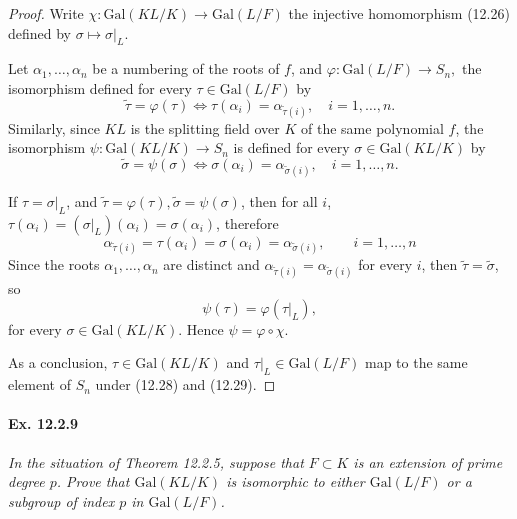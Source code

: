 \documentclass[11pt,a4paper]{article}
\newcommand{\Gal}{\mathrm{Gal}}
\begin{document}
\begin{proof}
Write $\chi : \Gal(KL/K) \to \Gal(L/F)$ the injective homomorphism (12.26) defined by $\sigma  \mapsto \sigma\vert_L$.


Let $\alpha_1,\ldots,\alpha_n$ be a numbering of the roots of $f$, and 
$\varphi : \Gal(L/F) \to S_n,$ the isomorphism defined for every  $\tau \in \Gal(L/F)$ by 
$$\tilde{\tau} = \varphi(\tau) \iff \tau(\alpha_i) = \alpha_{\tilde{\tau}(i)}, \quad i=1,\ldots,n.$$
Similarly, since $KL$ is the splitting field over $K$ of the same polynomial $f$, the isomorphism $\psi : \Gal(KL/K) \to S_n$ is defined for every $\sigma \in \Gal(KL/K)$ by
$$\tilde{\sigma} = \psi(\sigma) \iff \sigma(\alpha_i) = \alpha_{\tilde{\sigma}(i)}, \quad i=1,\ldots,n.$$

If $\tau = \sigma|_L$, and $\tilde{\tau} = \varphi(\tau), \tilde{\sigma}= \psi(\sigma)$, then for all $i$, $\tau(\alpha_i) =(\sigma|_L)(\alpha_i) = \sigma(\alpha_i)$, therefore
$$\alpha_{\tilde{\tau}(i)} = \tau(\alpha_i) = \sigma(\alpha_i) = \alpha_{\tilde{\sigma}(i)},\qquad i= 1,\ldots,n $$
Since the roots $\alpha_1,\ldots,\alpha_n$ are distinct and $\alpha_{\tilde{\tau}(i)} = \alpha_{\tilde{\sigma}(i)}$ for every $i$, then $\tilde{\tau} = \tilde{\sigma}$, so 
$$\psi(\tau) = \varphi(\tau|_L),$$
for every $\sigma \in \Gal(KL/K)$.  Hence $\psi = \varphi \circ \chi$.

As a conclusion,
$\tau \in \Gal(KL/K)$ and $\tau|_L \in \Gal(L/F)$ map to the same element of $S_n$ under (12.28) and (12.29).
\end{proof}

\paragraph{Ex. 12.2.9}

{\it In the situation of Theorem 12.2.5, suppose that $F\subset K$ is an extension of prime degree $p$. Prove that $\Gal(KL/K)$ is isomorphic to either $\Gal(L/F)$ or a subgroup of index $p$ in $\Gal(L/F)$.
}


\begin{center}


\end{center}
\end{document}
